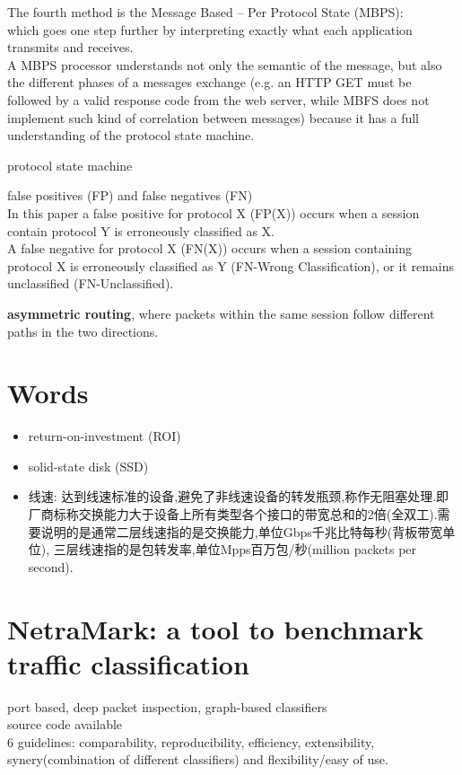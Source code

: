 \documentclass{article}
\begin{document}
The fourth method is the Message Based – Per Protocol State (MBPS):\\
which goes one step further by interpreting exactly what each application transmits and receives. \\
A MBPS processor understands not only the semantic of the message, but also the different phases of a messages exchange 
(e.g. an HTTP GET must be followed by a valid response code from the web server, while MBFS does not implement such kind of correlation between messages) 
because it has a full understanding of the protocol state machine. 

\bigskip
protocol state machine

\bigskip
false positives (FP) and false negatives (FN)\\
In this paper a false positive for protocol X (FP(X)) occurs when a session contain protocol Y is erroneously classified as X. \\
A false negative for protocol X (FN(X)) occurs when a session containing protocol X is erroneously classified as Y (FN-Wrong Classification), or it remains unclassified (FN-Unclassified).

\textbf{asymmetric routing}, where packets within the same session follow different paths in the two directions.

\section{Words}\label{words}
\begin{itemize}
\item return-on-investment (ROI)
\item solid-state disk (SSD)
\item 线速:
  达到线速标准的设备,避免了非线速设备的转发瓶颈,称作无阻塞处理.即厂商标称交换能力大于设备上所有类型各个接口的带宽总和的2倍(全双工).需要说明的是通常二层线速指的是交换能力,单位Gbps千兆比特每秒(背板带宽单位), 三层线速指的是包转发率,单位Mpps百万包/秒(million packets per second).
\end{itemize}

\section{NetraMark: a tool to benchmark traffic classification}
port based, deep packet inspection, graph-based classifiers\\
source code available\\
6 guidelines: comparability, reproducibility, efficiency, extensibility, synery(combination of different classifiers) and flexibility/easy of use.
\end{document}
